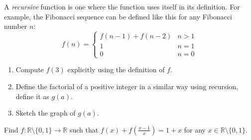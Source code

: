 \begin{problem}[1]
  A \emph{recursive} function is one where the function uses itself in its definition. For example, the Fibonacci sequence can be defined like this for any Fibonacci number \(n\): \begin{equation*}
    f(n) = \begin{cases}
      f(n-1) + f(n-2) & n>1 \\
      1 & n=1 \\
      0 & n=0 
    \end{cases}
  \end{equation*}
  \begin{enumerate}[label=\alph*)]
    \item{Compute \(f(3)\) explicitly using the definition of \(f\).}
    \item{Define the factorial of a positive integer in a similar way using recursion, define it as \(g(a)\).}
    \item{Sketch the graph of \(g(a)\).}
  \end{enumerate}

\end{problem} 

\begin{problem}[2]
  Find \(f:\mathbb{R}\setminus\{0,1\} \to  \mathbb{R}\) such that \(f(x)+f(\frac{x-1}{x})=1+x\) for any \(x\in\mathbb{R}\setminus\{0,1\}\).
\end{problem}

